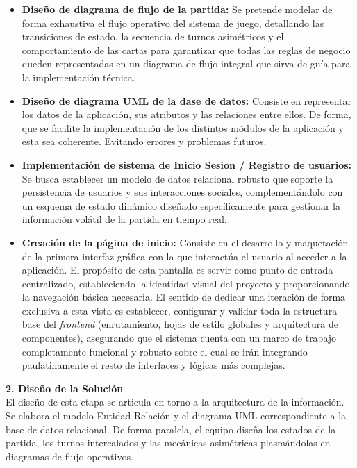 \begin{itemize}
    \item \textbf{Diseño de diagrama de flujo de la partida:} Se pretende modelar de forma exhaustiva el flujo operativo del sistema de juego, detallando las transiciones de estado, la secuencia de turnos asimétricos y el comportamiento de las cartas para garantizar que todas las reglas de negocio queden representadas en un diagrama de flujo integral que sirva de guía para la implementación técnica.

    \item \textbf{Diseño de diagrama UML de la dase de datos:} Consiste en representar los datos de la aplicación, sus atributos y las relaciones entre ellos. De forma, que se facilite la implementación de los distintos módulos de la aplicación y esta sea coherente. Evitando errores y problemas futuros.

    \item \textbf{Implementación de sistema de Inicio Sesion / Registro de usuarios:} Se busca establecer un modelo de datos relacional robusto que soporte la persistencia de usuarios y sus interacciones sociales, complementándolo con un esquema de estado dinámico diseñado específicamente para gestionar la información volátil de la partida en tiempo real.
    \item \textbf{Creación de la página de inicio:} Consiste en el desarrollo y maquetación de la primera interfaz gráfica con la que interactúa el usuario al acceder a la aplicación. El propósito de esta pantalla es servir como punto de entrada centralizado, estableciendo la identidad visual del proyecto y proporcionando la navegación básica necesaria. El sentido de dedicar una iteración de forma exclusiva a esta vista es establecer, configurar y validar toda la estructura base del \textit{frontend} (enrutamiento, hojas de estilo globales y arquitectura de componentes), asegurando que el sistema cuenta con un marco de trabajo completamente funcional y robusto sobre el cual se irán integrando paulatinamente el resto de interfaces y lógicas más complejas.
\end{itemize}

\textbf{2. Diseño de la Solución} \\
El diseño de esta etapa se articula en torno a la arquitectura de la información. Se elabora el modelo Entidad-Relación y el diagrama UML correspondiente a la base de datos relacional. De forma paralela, el equipo diseña los estados de la partida, los turnos intercalados y las mecánicas asimétricas plasmándolas en diagramas de flujo operativos.

